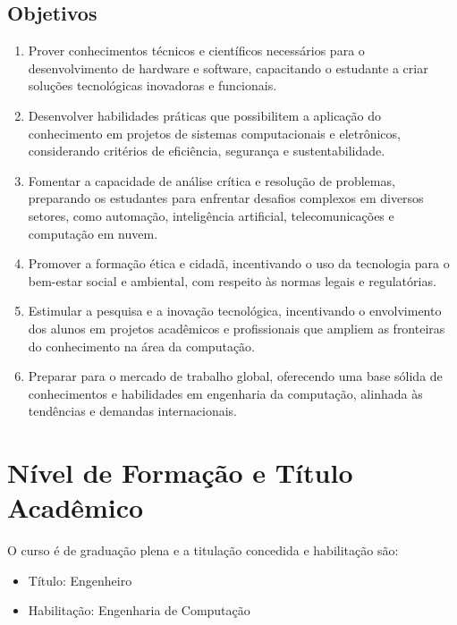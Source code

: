 \subsection{Objetivos}

\begin{enumerate}
    \item Prover conhecimentos técnicos e científicos necessários para o desenvolvimento de hardware e software, capacitando o estudante a criar soluções tecnológicas inovadoras e funcionais.

    \item Desenvolver habilidades práticas que possibilitem a aplicação do conhecimento em projetos de sistemas computacionais e eletrônicos, considerando critérios de eficiência, segurança e sustentabilidade.

    \item Fomentar a capacidade de análise crítica e resolução de problemas, preparando os estudantes para enfrentar desafios complexos em diversos setores, como automação, inteligência artificial, telecomunicações e computação em nuvem.

    \item Promover a formação ética e cidadã, incentivando o uso da tecnologia para o bem-estar social e ambiental, com respeito às normas legais e regulatórias.

    \item Estimular a pesquisa e a inovação tecnológica, incentivando o envolvimento dos alunos em projetos acadêmicos e profissionais que ampliem as fronteiras do conhecimento na área da computação.

    \item Preparar para o mercado de trabalho global, oferecendo uma base sólida de conhecimentos e habilidades em engenharia da computação, alinhada às tendências e demandas internacionais.

\end{enumerate}

\section{Nível de Formação e Título Acadêmico}

O curso é de graduação plena e a titulação concedida e habilitação são:

\begin{itemize}
\item{Título: Engenheiro}
\item{Habilitação: Engenharia de Computação}
\end{itemize}

